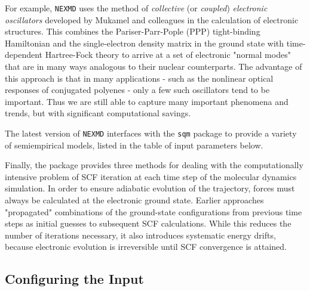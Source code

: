 \documentclass[12pt,letter,footinclude=true,headinclude=true,hyphens,oneside]{book} %
\begin{document}
    For example, \texttt{NEXMD} uses the method of \emph{collective} (or \emph{coupled}) \emph{electronic oscillators} developed by Mukamel and colleagues in the calculation of electronic structures. This combines the Pariser-Parr-Pople (PPP) tight-binding Hamiltonian and the single-electron density matrix in the ground state with time-dependent Hartree-Fock theory to arrive at a set of electronic "normal modes" that are in many ways analogous to their nuclear counterparts. The advantage of this approach is that in many applications - such as the nonlinear optical responses of conjugated polyenes - only a few such oscillators tend to be important. Thus we are still able to capture many important phenomena and trends, but with significant computational savings.
    
    The latest version of \texttt{NEXMD} interfaces with the \texttt{sqm} package to provide a variety of semiempirical models, listed in the table of input parameters below.
    
    Finally, the package provides three methods for dealing with the computationally intensive problem of SCF iteration at each time step of the molecular dynamics simulation. In order to ensure adiabatic evolution of the trajectory, forces must always be calculated at the electronic ground state. Earlier approaches "propagated" combinations of the ground-state configurations from previous time steps as initial guesses to subsequent SCF calculations. While this reduces the number of iterations necessary, it also introduces systematic energy drifts, because electronic evolution is irreversible until SCF convergence is attained.     
    
    \subsection{Configuring the Input}
    \label{ground-state-input}
    
\end{document}
